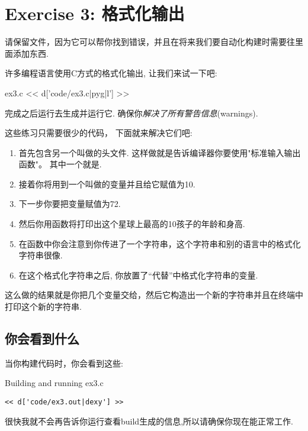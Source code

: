 \chapter{Exercise 3: 格式化输出}

请保留文件，因为它可以帮你找到错误，并且在将来我们要自动化构建时需要往里面添加东西.

许多编程语言使用C方式的格式化输出, 让我们来试一下吧:

\begin{code}{ex3.c}
<< d['code/ex3.c|pyg|l'] >>
\end{code}

完成之后运行去生成并运行它. 
确保你\emph{解决了所有警告信息}(warnings).

这些练习只需要很少的代码， 下面就来解决它们吧:

\begin{enumerate}
\item 首先包含另一个叫做的头文件. 这样做就是告诉编译器你要使用"标准输入输出函数"。 其中一个就是.
\item 接着你将用到一个叫做的变量并且给它赋值为10.
\item 下一步你要把变量赋值为72.
\item 然后你用函数将打印出这个星球上最高的10孩子的年龄和身高.
\item 在函数中你会注意到你传进了一个字符串，这个字符串和别的语言中的格式化字符串很像.
\item 在这个格式化字符串之后, 你放置了“代替”中格式化字符串的变量.
\end{enumerate}

这么做的结果就是你把几个变量交给，然后它构造出一个新的字符串并且在终端中打印这个新的字符串.

\section{你会看到什么}

当你构建代码时，你会看到这些:

\begin{Terminal}{Building and running ex3.c}
\begin{lstlisting}
<< d['code/ex3.out|dexy'] >>
\end{lstlisting}
\end{Terminal}

很快我就不会再告诉你运行查看build生成的信息,所以请确保你现在能正常工作.

